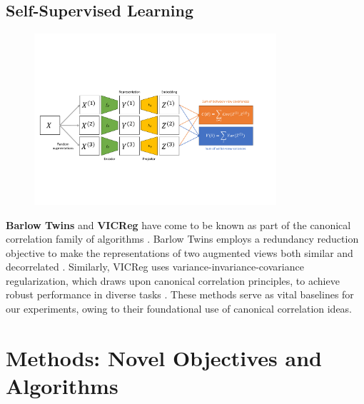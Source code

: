 \subsection{Self-Supervised Learning}

\begin{figure}
    \centering
    \includegraphics[width=0.8\textwidth]{figures/ssl_schematic}
\end{figure}

\textbf{Barlow Twins} and \textbf{VICReg} have come to be known as part of the canonical correlation family of algorithms \citep{balestriero2023cookbook}. Barlow Twins employs a redundancy reduction objective to make the representations of two augmented views both similar and decorrelated \citep{zbontar2021barlow}. Similarly, VICReg uses variance-invariance-covariance regularization, which draws upon canonical correlation principles, to achieve robust performance in diverse tasks \citep{bardes2021vicreg}. These methods serve as vital baselines for our experiments, owing to their foundational use of canonical correlation ideas.

\section{Methods: Novel Objectives and Algorithms}\label{sec:contributions}

